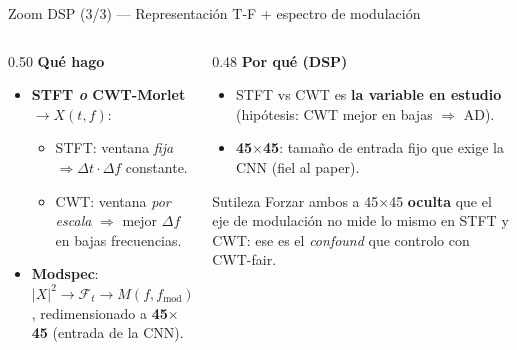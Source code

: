 \documentclass[aspectratio=169, 11pt]{beamer}
\begin{document}
\begin{frame}{Zoom DSP (3/3) --- Representación T-F + espectro de modulación}

\begin{columns}[T]
\begin{column}{0.50\textwidth}
\small\textbf{Qué hago}
\begin{itemize}
    \item \textbf{STFT \emph{o} CWT-Morlet} $\to X(t,f)$:
    \begin{itemize}\scriptsize
        \item STFT: ventana \emph{fija} $\Rightarrow \Delta t\cdot\Delta f$
        constante.
        \item CWT: ventana \emph{por escala} $\Rightarrow$ mejor $\Delta f$
        en bajas frecuencias.
    \end{itemize}
    \item \textbf{Modspec}: $|X|^2 \to \mathcal{F}_t \to
    M(f,f_{\text{mod}})$, redimensionado a \textbf{45$\times$45} (entrada
    de la CNN).
\end{itemize}
\end{column}
\begin{column}{0.48\textwidth}
\small\textbf{Por qué (DSP)}
\begin{itemize}
    \item STFT vs CWT es \textbf{la variable en estudio} (hipótesis: CWT
    mejor en bajas $\Rightarrow$ AD).
    \item \textbf{45$\times$45}: tamaño de entrada fijo que exige la CNN
    (fiel al paper).
\end{itemize}
\vspace{3pt}
\begin{alertblock}{Sutileza }
\scriptsize Forzar ambos a 45$\times$45 \textbf{oculta} que el eje de
modulación no mide lo mismo en STFT y CWT: ese es el \emph{confound} que
controlo con CWT-fair.
\end{alertblock}
\end{column}
\end{columns}

\end{frame}
\end{document}
